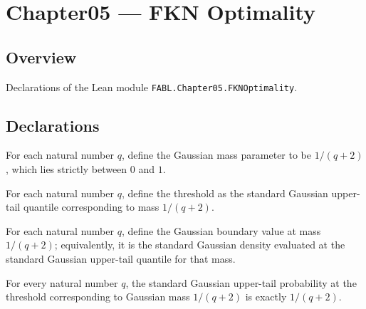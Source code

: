 \chapter{Chapter05 — FKN Optimality}
\section{Overview}

Declarations of the Lean module \texttt{FABL.Chapter05.FKNOptimality}.

\section{Declarations}

\begin{definition}
\label{FABL.fknOptimalityGaussianMass}
\leanok
For each natural number $q$, define the Gaussian mass parameter to be $1/(q+2)$, which
lies strictly between $0$ and $1$.
\end{definition}

\begin{definition}
\label{FABL.fknOptimalityThreshold}
\leanok
{}
For each natural number $q$, define the threshold as the standard Gaussian upper-tail
quantile corresponding to mass $1/(q+2)$.
\end{definition}

\begin{definition}
\label{FABL.fknOptimalityGaussianBoundary}
\leanok
{}
For each natural number $q$, define the Gaussian boundary value at mass $1/(q+2)$;
equivalently, it is the standard Gaussian density evaluated at the standard Gaussian
upper-tail quantile for that mass.
\end{definition}

\begin{theorem}
\label{FABL.standardGaussianUpperTail_fknOptimalityThreshold}
\leanok
{}
For every natural number $q$, the standard Gaussian upper-tail probability at the
threshold corresponding to Gaussian mass $1/(q+2)$ is exactly $1/(q+2)$.
\end{theorem}

